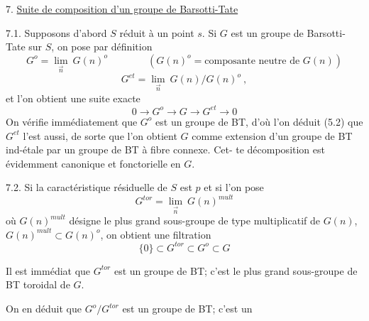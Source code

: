 
7. \uline{Suite de composition d'un groupe de Barsotti-Tate}

7.1. Supposons d'abord $S$ réduit à un point $s$. Si $G$ est un
groupe de Barsotti-Tate sur $S$, on pose par définition
\[ G^{o} = \underset{\vec{n}}{\lim}\ G(n)^{o} \qquad\qquad (G(n)^{o} = \text{composante neutre de } G(n)) \]
\[ G^{et} = \underset{\vec{n}}{\lim}\ G(n)/G(n)^{o} \ , \]
et l'on obtient une suite exacte
\[ 0 \to G^{o} \to G \to G^{et} \to 0 \]
On vérifie immédiatement que $G^{o}$ est un groupe de BT, d'où l'on déduit
(5.2) que $G^{et}$ l'est aussi, de sorte que l'on obtient $G$ comme extension
d'un groupe de BT ind-étale par un groupe de BT à fibre connexe. Cet-%
te décomposition est évidemment canonique et fonctorielle en $G$.

7.2. Si la caractéristique résiduelle de $S$ est $p$ et si l'on pose
\[ G^{tor} = \underset{\vec{n}}{\lim}\ G(n)^{mult} \]
où $G(n)^{mult}$ désigne le plus grand sous-groupe de type multiplicatif de
$G(n)$, $G(n)^{mult} \subset G(n)^{o}$, on obtient une filtration
\[ \{0\} \subset G^{tor} \subset G^{o} \subset G \]

Il est immédiat que $G^{tor}$ est un groupe de BT; c'est le plus
grand sous-groupe de BT toroidal de $G$.

On en déduit que $G^{o}/G^{tor}$ est un groupe de BT; c'est un

